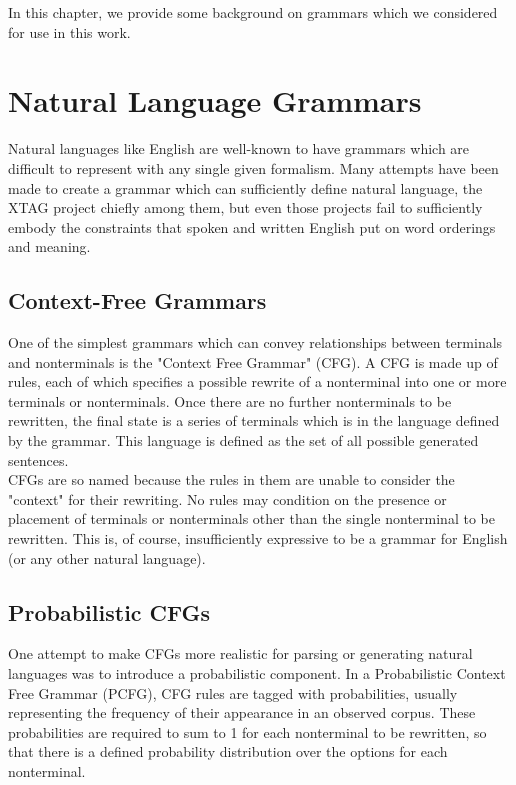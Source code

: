 In this chapter, we provide some background on grammars which we considered for use in this work.

\section{Natural Language Grammars}

Natural languages like English are well-known to have grammars which are difficult
to represent with any single given formalism.  Many attempts have been made to
create a grammar which can sufficiently define natural language, the XTAG project
chiefly among them, but even those projects fail to sufficiently embody the
constraints that spoken and written English put on word orderings and meaning.

\subsection{Context-Free Grammars}

One of the simplest grammars which can convey relationships between terminals
and nonterminals is the "Context Free Grammar" (CFG).  A CFG is made up of rules,
each of which specifies a possible rewrite of a nonterminal into one or more
terminals or nonterminals.  Once there are no further nonterminals to be rewritten,
the final state is a series of terminals which is in the language defined by the grammar.
This language is defined as the set of all possible generated sentences.\\

CFGs are so named because the rules in them are unable to consider the "context" for
their rewriting.  No rules may condition on the presence or placement of terminals
or nonterminals other than the single nonterminal to be rewritten.  This is, of course,
insufficiently expressive to be a grammar for English (or any other natural language).\\

\subsection{Probabilistic CFGs}

One attempt to make CFGs more realistic for parsing or generating natural languages was to
introduce a probabilistic component.  In a Probabilistic Context Free Grammar (PCFG), CFG
rules are tagged with probabilities, usually representing the frequency of their appearance in
an observed corpus.  These probabilities are required to sum to 1 for each nonterminal to
be rewritten, so that there is a defined probability distribution over the options for each nonterminal.\\

